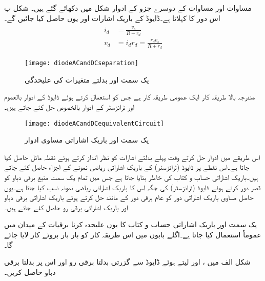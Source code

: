مساوات   اور مساوات   کے دوسرے جزو کے ادوار شکل    میں دکھائے گئے ہیں۔
شکل  ب اس دور کا  کہلاتا ہے۔ڈایوڈ کے باریک اشارات  اور  یوں حاصل کیا جائیں گے۔
\begin{gather}
\begin{aligned}
i_d&=\frac{v_s}{R+r_d}\\
v_d&=i_d r_d=\frac{r_d v_s}{R+r_d}
\end{aligned}
\end{gather}
%
\begin{figure}
\centering
\texttt{[image: diodeACandDCseparation]}
\caption{یک سمت اور بدلتے متغیرات کی علیحدگی}
\label{شکل_یک_سمتی_بدلتے_متغیرات_کی_علیحدگی}
\end{figure}
مندرجہ بالا طریقہ کار ایک عمومی طریقہ کار ہے جس کو استعمال کرتے ہوئے ڈایوڈ کے ادوار بالعموم اور ٹرانزسٹر کے ادوار بالخصوص حل کئے جاتے ہیں۔
\begin{figure}
\centering
\texttt{[image: diodeACandDCequivalentCircuit]}
\caption{یک سمت اور باریک اشاراتی مساوی ادوار}
\label{شکل_یک_سمتی_اور_باریک_اشاراتی_مساوی_ادوار}
\end{figure}
اس طریقے میں ادوار حل کرتے وقت پہلے بدلتے اشارات کو نظر انداز کرتے ہوئے نقطہ مائل حاصل کیا جاتا ہے۔اس نقطے پر ڈایوڈ (ٹرانزسٹر) کے باریک اشاراتی ریاضی نمونے کے اجزاء حاصل کئے جاتے ہیں۔باریک اشاراتی حساب و کتاب کی خاطر  بنایا جاتا ہے جس میں تمام یک سمت منبع برقی دباو کو قصر دور کرتے ہوئے ڈایوڈ (ٹرانزسٹر)  کی جگہ اس کا باریک اشاراتی ریاضی نمونہ نسب کیا جاتا ہے۔یوں حاصل مساوی باریک اشاراتی دور کو عام برقی دور کے مانند حل کرتے ہوئے باریک اشاراتی برقی دباو اور باریک اشاراتی برقی رو حاصل کئے جاتے ہیں۔

یک سمت اور باریک اشاراتی حساب و کتاب کا یوں علیحدہ کرنا برقیات کے میدان میں عموماً استعمال کیا جاتا ہے۔اگلے بابوں میں اس طریقہ کار کو بار بار بروئے کار لایا جائے گا۔

شکل  الف میں  ،   اور  لیتے ہوئے ڈایوڈ سے گزرتی بدلتا برقی رو    اور اس پر بدلتا برقی دباو  حاصل کریں۔


